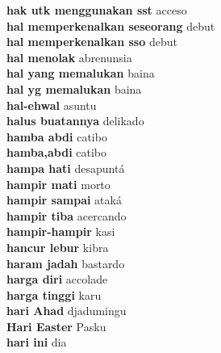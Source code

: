 \textbf{ hak utk menggunakan sst  } acceso \\
\textbf{ hal memperkenalkan seseorang  } debut \\
\textbf{ hal memperkenalkan sso  } debut \\
\textbf{ hal menolak  } abrenunsia \\
\textbf{ hal yang memalukan  } baina \\
\textbf{ hal yg memalukan  } baina \\
\textbf{ hal-ehwal  } asuntu \\
\textbf{ halus buatannya  } delikado \\
\textbf{ hamba abdi  } catibo \\
\textbf{ hamba,abdi  } catibo \\
\textbf{ hampa hati  } desapuntá \\
\textbf{ hampir mati  } morto \\
\textbf{ hampir sampai  } ataká \\
\textbf{ hampir tiba  } acercando \\
\textbf{ hampir-hampir  } kasi \\
\textbf{ hancur lebur  } kibra \\
\textbf{ haram jadah  } bastardo \\
\textbf{ harga diri  } accolade \\
\textbf{ harga tinggi  } karu \\
\textbf{ hari Ahad  } djadumingu \\
\textbf{ Hari Easter  } Pasku \\
\textbf{ hari ini  } dia \\

